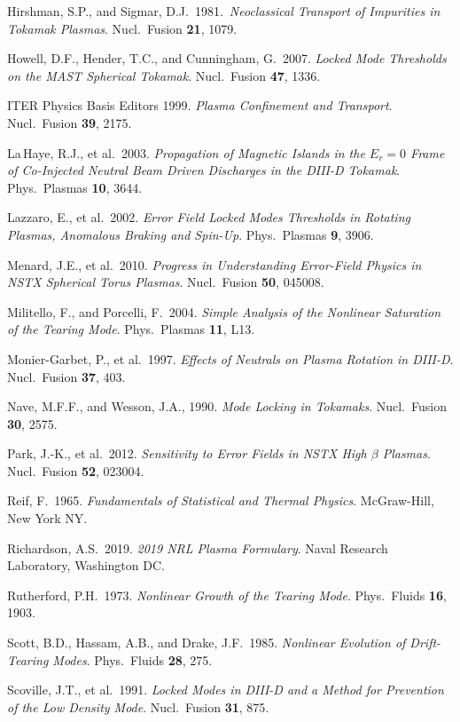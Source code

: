 \documentclass[notitlepage,12pt]{article}
\begin{document}
\begin{description}
\item Hirshman, S.P., and Sigmar, D.J.\ 1981.\ {\em Neoclassical Transport of Impurities in Tokamak Plasmas}. Nucl.\ Fusion {\bf 21}, 1079.
\item Howell, D.F., Hender, T.C., and Cunningham, G.\ 2007. {\em Locked Mode Thresholds on the MAST Spherical Tokamak}. Nucl.\ Fusion {\bf 47}, 1336. 
\item ITER Physics Basis Editors 1999. {\em Plasma Confinement and Transport}. Nucl.\ Fusion {\bf 39}, 2175. 
\item La\,Haye, R.J., et al.\ 2003. {\em Propagation of Magnetic Islands in the  $E_r=0$ Frame of Co-Injected Neutral Beam Driven Discharges in the DIII-D Tokamak}. Phys.\ Plasmas {\bf 10}, 3644. 
\item Lazzaro, E., et al.\ 2002. {\em Error Field Locked Modes Thresholds in Rotating Plasmas, Anomalous Braking and Spin-Up}. Phys.\ Plasmas {\bf 9}, 3906. 
\item Menard, J.E., et al.\ 2010. {\em Progress in Understanding Error-Field Physics in NSTX Spherical Torus Plasmas}. Nucl.\ Fusion {\bf 50}, 045008.
\item Militello, F., and Porcelli, F.\ 2004. {\em Simple Analysis of the Nonlinear Saturation of the Tearing Mode}. Phys.\ Plasmas {\bf 11}, L13. 
\item Monier-Garbet, P., et al.\ 1997. {\em Effects of Neutrals on Plasma Rotation in DIII-D}. Nucl.\ Fusion {\bf 37}, 403.
\item Nave, M.F.F., and Wesson, J.A., 1990. {\em Mode Locking in Tokamaks}. Nucl.\ Fusion {\bf 30}, 2575. 
\item Park, J.-K., et al.\ 2012. {\em  Sensitivity to Error Fields in NSTX High $\beta$ Plasmas}. Nucl.\ Fusion {\bf 52}, 023004. 
\item Reif, F.\ 1965. {\em Fundamentals of Statistical and Thermal Physics}. McGraw-Hill, New York NY. 
\item Richardson, A.S.\ 2019. {\em 2019 NRL Plasma Formulary}.  Naval Research Laboratory, Washington DC. 
\item Rutherford, P.H.\ 1973. {\em Nonlinear Growth of the Tearing Mode}. Phys.\ Fluids {\bf 16}, 1903. 
\item Scott, B.D., Hassam, A.B., and Drake, J.F.\ 1985. {\em Nonlinear Evolution of Drift-Tearing Modes}. Phys.\ Fluids
{\bf 28}, 275. 
\item Scoville, J.T., et al.\ 1991. {\em Locked Modes in DIII-D and a Method for Prevention of the Low Density Mode}. Nucl.\ Fusion {\bf 31}, 875. 

\end{description}
\end{document}

